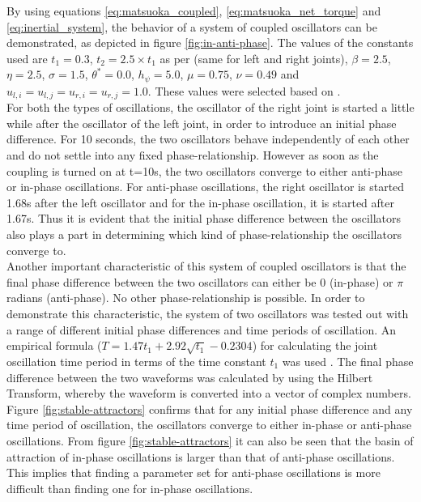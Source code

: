 \documentclass[12pt,twoside]{article}
\theoremstyle{plain}
\theoremstyle{definition}
\theoremstyle{remark}
\newcommand{\forceindent}{\leavevmode{\parindent=2em\indent}}
\begin{document}
\forceindent By using equations \ref{eq:matsuoka_coupled}, \ref{eq:matsuoka_net_torque} and  \ref{eq:inertial_system}, the behavior of a system of coupled oscillators can be demonstrated, as depicted in figure \ref{fig:in-anti-phase}. The values of the constants used are $t_1=0.3$, $t_2= 2.5 \times t_1$ as per \cite{Ronsse2009} (same for left and right joints), $\beta=2.5$,  $\eta=2.5$, $\sigma=1.5$, $\theta^*=0.0$, $h_{\psi}=5.0$, $\mu=0.75$, $\nu=0.49$ and $u_{l,i}=u_{l,j}=u_{r,i}=u_{r,j}=1.0$. These values were selected based on \cite{Ronsse2009}.\\
\forceindent For both the types of oscillations, the oscillator of the right joint is started a little while after the oscillator of the left joint, in order to introduce an initial phase difference. For 10 seconds, the two oscillators behave independently of each other and do not settle into any fixed phase-relationship. However as soon as the coupling is turned on at t=10s, the two oscillators converge to either anti-phase or in-phase oscillations. For anti-phase oscillations, the right oscillator is started 1.68s after the left oscillator and for the in-phase oscillation, it is started after 1.67s. Thus it is evident that the initial phase difference between the oscillators also plays a part in determining which kind of phase-relationship the oscillators converge to.\\
\forceindent Another important characteristic of this system of coupled oscillators is that the final phase difference between the two oscillators can either be 0 (in-phase) or $\pi$ radians (anti-phase). No other phase-relationship is possible. In order to demonstrate this characteristic, the system of two oscillators was tested out with a range of different initial phase differences and time periods of oscillation. An empirical formula ($T=1.47t_1 + 2.92\sqrt{t_1} - 0.2304$) for calculating the joint oscillation time period in terms of the time constant $t_1$ was used \cite{Ronsse2009}. The final phase difference between the two waveforms was calculated by using the Hilbert Transform, whereby the waveform is converted into a vector of complex numbers. Figure \ref{fig:stable-attractors} confirms that for any initial phase difference and any time period of oscillation, the oscillators converge to either in-phase or anti-phase oscillations. From figure \ref{fig:stable-attractors} it can also be seen that the basin of attraction of in-phase oscillations is larger than that of anti-phase oscillations. This implies that finding a parameter set for anti-phase oscillations is more difficult than finding one for in-phase oscillations.
\end{document}
